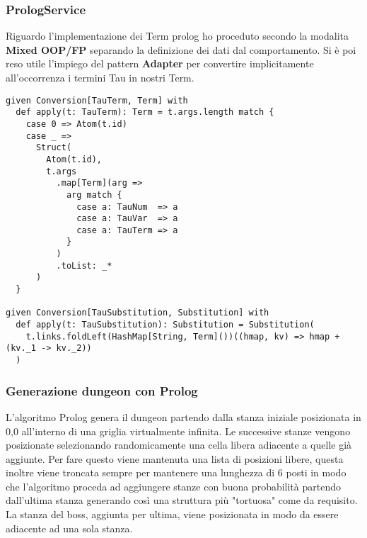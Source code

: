 \subsubsection{PrologService}
Riguardo l'implementazione dei Term prolog ho proceduto secondo la modalita \textbf{Mixed OOP/FP} separando la definizione dei dati dal comportamento. Si è poi reso utile l'impiego del pattern \textbf{Adapter} per convertire implicitamente all'occorrenza i termini Tau in nostri Term.
\begin{lstlisting}[basicstyle=\tiny]
given Conversion[TauTerm, Term] with
  def apply(t: TauTerm): Term = t.args.length match {
    case 0 => Atom(t.id)
    case _ =>
      Struct(
        Atom(t.id),
        t.args
          .map[Term](arg =>
            arg match {
              case a: TauNum  => a
              case a: TauVar  => a
              case a: TauTerm => a
            }
          )
          .toList: _*
      )
  }

given Conversion[TauSubstitution, Substitution] with
  def apply(t: TauSubstitution): Substitution = Substitution(
    t.links.foldLeft(HashMap[String, Term]())((hmap, kv) => hmap + (kv._1 -> kv._2))
  )
\end{lstlisting} 

\subsubsection{Generazione dungeon con Prolog}
L'algoritmo Prolog genera il dungeon partendo dalla stanza iniziale posizionata in 0,0 all'interno di una griglia virtualmente infinita. 
Le successive stanze vengono posizionate selezionando randomicamente una cella libera adiacente a quelle già aggiunte. 
Per fare questo viene mantenuta una lista di posizioni libere, questa inoltre viene troncata sempre per mantenere una lunghezza di 6 posti in modo che l'algoritmo proceda ad aggiungere stanze con buona probabilità partendo dall'ultima stanza generando così una struttura più "tortuosa" come da requisito.
La stanza del boss, aggiunta per ultima, viene posizionata in modo da essere adiacente ad una sola stanza.